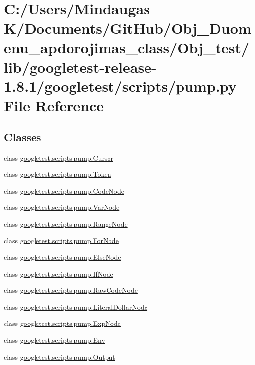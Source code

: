 \hypertarget{_obj__test_2lib_2googletest-release-1_88_81_2googletest_2scripts_2pump_8py}{}\section{C\+:/\+Users/\+Mindaugas K/\+Documents/\+Git\+Hub/\+Obj\+\_\+\+Duomenu\+\_\+apdorojimas\+\_\+class/\+Obj\+\_\+test/lib/googletest-\/release-\/1.8.1/googletest/scripts/pump.py File Reference}
\label{_obj__test_2lib_2googletest-release-1_88_81_2googletest_2scripts_2pump_8py}
\subsection*{Classes}
\begin{DoxyCompactItemize}
\item 
class \mbox{\hyperlink{classgoogletest_1_1scripts_1_1pump_1_1_cursor}{googletest.\+scripts.\+pump.\+Cursor}}
\item 
class \mbox{\hyperlink{classgoogletest_1_1scripts_1_1pump_1_1_token}{googletest.\+scripts.\+pump.\+Token}}
\item 
class \mbox{\hyperlink{classgoogletest_1_1scripts_1_1pump_1_1_code_node}{googletest.\+scripts.\+pump.\+Code\+Node}}
\item 
class \mbox{\hyperlink{classgoogletest_1_1scripts_1_1pump_1_1_var_node}{googletest.\+scripts.\+pump.\+Var\+Node}}
\item 
class \mbox{\hyperlink{classgoogletest_1_1scripts_1_1pump_1_1_range_node}{googletest.\+scripts.\+pump.\+Range\+Node}}
\item 
class \mbox{\hyperlink{classgoogletest_1_1scripts_1_1pump_1_1_for_node}{googletest.\+scripts.\+pump.\+For\+Node}}
\item 
class \mbox{\hyperlink{classgoogletest_1_1scripts_1_1pump_1_1_else_node}{googletest.\+scripts.\+pump.\+Else\+Node}}
\item 
class \mbox{\hyperlink{classgoogletest_1_1scripts_1_1pump_1_1_if_node}{googletest.\+scripts.\+pump.\+If\+Node}}
\item 
class \mbox{\hyperlink{classgoogletest_1_1scripts_1_1pump_1_1_raw_code_node}{googletest.\+scripts.\+pump.\+Raw\+Code\+Node}}
\item 
class \mbox{\hyperlink{classgoogletest_1_1scripts_1_1pump_1_1_literal_dollar_node}{googletest.\+scripts.\+pump.\+Literal\+Dollar\+Node}}
\item 
class \mbox{\hyperlink{classgoogletest_1_1scripts_1_1pump_1_1_exp_node}{googletest.\+scripts.\+pump.\+Exp\+Node}}
\item 
class \mbox{\hyperlink{classgoogletest_1_1scripts_1_1pump_1_1_env}{googletest.\+scripts.\+pump.\+Env}}
\item 
class \mbox{\hyperlink{classgoogletest_1_1scripts_1_1pump_1_1_output}{googletest.\+scripts.\+pump.\+Output}}
\end{DoxyCompactItemize}
